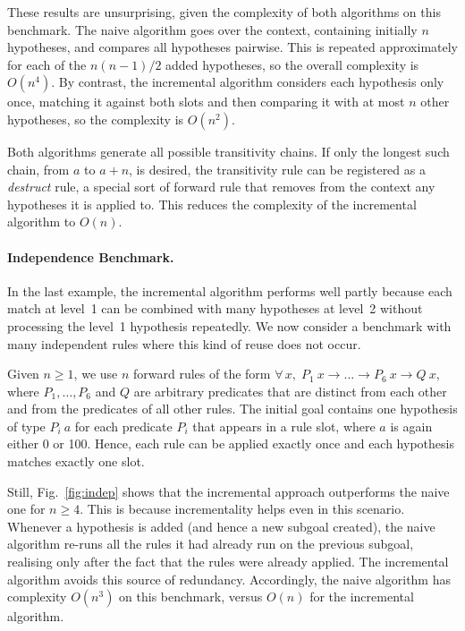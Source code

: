 \documentclass[runningheads,leqno]{llncs}
\newcommand{\para}[1]{\paragraph{\bfseries\upshape #1}}
\newcommand{\All}[2]{\ensuremath{\forall\, #1,\; #2}}
\begin{document}
These results are unsurprising, given the complexity of both algorithms on this benchmark.
The naive algorithm goes over the context, containing initially $n$ hypotheses, and compares all hypotheses pairwise.
This is repeated approximately for each of the $n(n-1)/2$ added hypotheses, so the overall complexity is $O(n^4)$.
By contrast, the incremental algorithm considers each hypothesis only once, matching it against both slots and then comparing it with at most $n$ other hypotheses, so the complexity is $O(n^{2})$.

Both algorithms generate all possible transitivity chains.
If only the longest such chain, from $a$ to $a + n$, is desired, the transitivity rule can be registered as a \emph{destruct} rule, a special sort of forward rule that removes from the context any hypotheses it is applied to.
This reduces the complexity of the incremental algorithm to $O(n)$.

\para{Independence Benchmark.}
In the last example, the incremental algorithm performs well partly because each match at level~1 can be combined with many hypotheses at level~2 without processing the level~1 hypothesis repeatedly.
We now consider a benchmark with many independent rules where this kind of reuse does not occur.

Given $n ≥ 1$, we use $n$ forward rules of the form $\All{x}{P_{1}~x → \dots → P_{6}~x → Q~x}$, where $P_{1}, \dots, P_{6}$ and $Q$ are arbitrary predicates that are distinct from each other and from the predicates of all other rules.
The initial goal contains one hypothesis of type $P_{i}~a$ for each predicate $P_{i}$ that appears in a rule slot, where $a$ is again either 0 or 100.
Hence, each rule can be applied exactly once and each hypothesis matches exactly one slot.

Still, Fig.~\ref{fig:indep} shows that the incremental approach outperforms the naive one for $n ≥ 4$.
This is because incrementality helps even in this scenario.
Whenever a hypothesis is added (and hence a new subgoal created), the naive algorithm re-runs all the rules it had already run on the previous subgoal, realising only after the fact that the rules were already applied.
The incremental algorithm avoids this source of redundancy.
Accordingly, the naive algorithm has complexity $O(n^{3})$ on this benchmark, versus $O(n)$ for the incremental algorithm.
\end{document}
